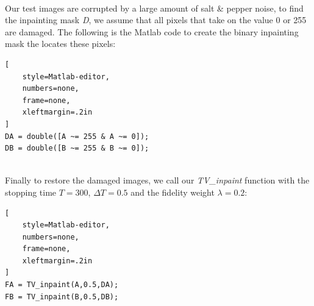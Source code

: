 \documentclass[a4paper,11pt]{article}
\begin{document}
 \\
Our test images are corrupted by a large amount of salt \& pepper noise, to find the inpainting mask \emph{D}, we assume that all pixels that take on the value 0 or 255 are damaged. The following is the Matlab code to create the binary inpainting mask the locates these pixels: \\
\begin{lstlisting}[
    style=Matlab-editor,
    numbers=none,
    frame=none,
    xleftmargin=.2in
]
DA = double([A ~= 255 & A ~= 0]);
DB = double([B ~= 255 & B ~= 0]);
\end{lstlisting}
 \\
Finally to restore the damaged images, we call our \emph{TV\_inpaint} function with the stopping time $T = 300$, $\Delta T=0.5$ and the fidelity weight $\lambda=0.2$:
\begin{lstlisting}[
    style=Matlab-editor,
    numbers=none,
    frame=none,
    xleftmargin=.2in
]
FA = TV_inpaint(A,0.5,DA); 
FB = TV_inpaint(B,0.5,DB);
\end{lstlisting}



\newpage
\end{document}
